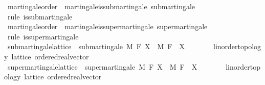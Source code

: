 \begin{isabellebody}
\endisatagproof
{\isafoldproof}%
%
\isadelimproof
%
\endisadelimproof
\isanewline
\isanewline
{}\isamarkupfalse%
\isanewline
\isanewline
{}\isamarkupfalse%
\ martingale{\isacharunderscore}{\kern0pt}order\ {\isasymsubseteq}\ martingale{\isacharunderscore}{\kern0pt}is{\isacharunderscore}{\kern0pt}submartingale{\isacharcolon}{\kern0pt}\ submartingale%
\isadelimproof
\ %
\endisadelimproof
%
\isatagproof
{}\isamarkupfalse%
\ {\isacharparenleft}{\kern0pt}rule\ is{\isacharunderscore}{\kern0pt}submartingale{\isacharparenright}{\kern0pt}%
\endisatagproof
{\isafoldproof}%
%
\isadelimproof
%
\endisadelimproof
\isanewline
\isanewline
{}\isamarkupfalse%
\ martingale{\isacharunderscore}{\kern0pt}order\ {\isasymsubseteq}\ martingale{\isacharunderscore}{\kern0pt}is{\isacharunderscore}{\kern0pt}supermartingale{\isacharcolon}{\kern0pt}\ supermartingale%
\isadelimproof
\ %
\endisadelimproof
%
\isatagproof
{}\isamarkupfalse%
\ {\isacharparenleft}{\kern0pt}rule\ is{\isacharunderscore}{\kern0pt}supermartingale{\isacharparenright}{\kern0pt}%
\endisatagproof
{\isafoldproof}%
%
\isadelimproof
%
\endisadelimproof
\isanewline
\isanewline
{}\isamarkupfalse%
\ submartingale{\isacharunderscore}{\kern0pt}lattice\ {\isacharequal}{\kern0pt}\ submartingale\ M\ F\ X\ \ M\ F\ \ X\ {\isacharcolon}{\kern0pt}{\isacharcolon}{\kern0pt}\ {\isachardoublequoteopen}{\isacharunderscore}{\kern0pt}\ {\isasymRightarrow}\ {\isacharunderscore}{\kern0pt}\ {\isasymRightarrow}\ {\isacharunderscore}{\kern0pt}\ {\isacharcolon}{\kern0pt}{\isacharcolon}{\kern0pt}\ {\isacharbraceleft}{\kern0pt}linorder{\isacharunderscore}{\kern0pt}topology{\isacharcomma}{\kern0pt}\ lattice{\isacharcomma}{\kern0pt}\ ordered{\isacharunderscore}{\kern0pt}real{\isacharunderscore}{\kern0pt}vector{\isacharbraceright}{\kern0pt}{\isachardoublequoteclose}\isanewline
\isanewline
{}\isamarkupfalse%
\ supermartingale{\isacharunderscore}{\kern0pt}lattice\ {\isacharequal}{\kern0pt}\ supermartingale\ M\ F\ X\ \ M\ F\ \ X\ {\isacharcolon}{\kern0pt}{\isacharcolon}{\kern0pt}\ {\isachardoublequoteopen}{\isacharunderscore}{\kern0pt}\ {\isasymRightarrow}\ {\isacharunderscore}{\kern0pt}\ {\isasymRightarrow}\ {\isacharunderscore}{\kern0pt}\ {\isacharcolon}{\kern0pt}{\isacharcolon}{\kern0pt}\ {\isacharbraceleft}{\kern0pt}linorder{\isacharunderscore}{\kern0pt}topology{\isacharcomma}{\kern0pt}\ lattice{\isacharcomma}{\kern0pt}\ ordered{\isacharunderscore}{\kern0pt}real{\isacharunderscore}{\kern0pt}vector{\isacharbraceright}{\kern0pt}{\isachardoublequoteclose}\isanewline

\end{isabellebody}

